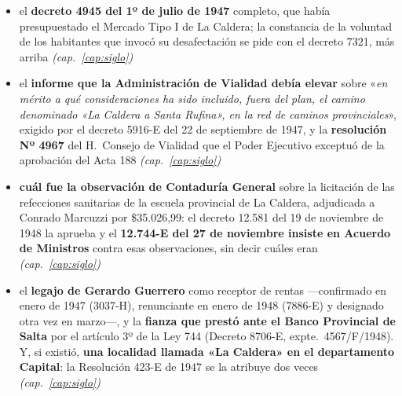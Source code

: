\begin{itemize}[leftmargin=*]
\item el \textbf{decreto 4945 del 1º de julio de 1947} completo, que había presupuestado el Mercado Tipo I de La Caldera; la constancia de la voluntad de los habitantes que invocó su desafectación se pide con el decreto 7321, más arriba \textit{(cap.\ \ref{cap:siglo})}
\item el \textbf{informe que la Administración de Vialidad debía elevar} sobre «\textit{en mérito a qué consideraciones ha sido incluido, fuera del plan, el camino denominado «La Caldera a Santa Rufina», en la red de caminos provinciales}», exigido por el decreto 5916-E del 22 de septiembre de 1947, y la \textbf{resolución Nº 4967} del H.\ Consejo de Vialidad que el Poder Ejecutivo exceptuó de la aprobación del Acta 188 \textit{(cap.\ \ref{cap:siglo})}
\item \textbf{cuál fue la observación de Contaduría General} sobre la licitación de las refecciones sanitarias de la escuela provincial de La Caldera, adjudicada a Conrado Marcuzzi por \$35.026,99: el decreto 12.581 del 19 de noviembre de 1948 la aprueba y el \textbf{12.744-E del 27 de noviembre insiste en Acuerdo de Ministros} contra esas observaciones, sin decir cuáles eran \textit{(cap.\ \ref{cap:siglo})}
\item el \textbf{legajo de Gerardo Guerrero} como receptor de rentas ---confirmado en enero de 1947 (3037-H), renunciante en enero de 1948 (7886-E) y designado otra vez en marzo---, y la \textbf{fianza que prestó ante el Banco Provincial de Salta} por el artículo 3º de la Ley 744 (Decreto 8706-E, expte.\ 4567/F/1948). Y, si existió, \textbf{una localidad llamada «La Caldera» en el departamento Capital}: la Resolución 423-E de 1947 se la atribuye dos veces \textit{(cap.\ \ref{cap:siglo})}

\end{itemize}
